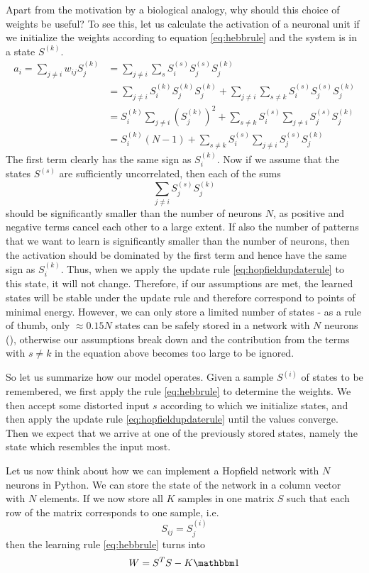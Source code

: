 \documentclass[a4paper, draft]{article}
\theoremstyle{own}
\theoremstyle{remark}
\begin{document}
Apart from the motivation by a biological analogy, why should this choice of weights be useful? To see this, let us calculate the activation of a neuronal unit if we initialize the weights according to equation \eqref{eq:hebbrule} and the system is in a state $S^{(k)}$.
\begin{align*}
a_i = \sum_{j \neq i} w_{ij} S_j^{(k)} &= 
\sum_{j \neq i} \sum_s S_i^{(s)} S_j^{(s)} S_j^{(k)} \\
&= \sum_{j \neq i} S_i^{(k)} S_j^{(k)} S_j^{(k)} + \sum_{j \neq i} \sum_{s \neq k} S_i^{(s)} S_j^{(s)} S_j^{(k)} \\
&= S_i^{(k)} \sum_{j \neq i}  (S_j^{(k)})^2 + \sum_{s \neq k} S_i^{(s)} 
\sum_{j \neq i} S_j^{(s)} S_j^{(k)} \\
&= S_i^{(k)} (N-1) + \sum_{s \neq k} S_i^{(s)} 
\sum_{j \neq i} S_j^{(s)} S_j^{(k)}
\end{align*}
The first term clearly has the same sign as $S_i^{(k)}$. Now if we assume that the states $S^{(s)}$ are sufficiently uncorrelated, then each of the sums
$$
\sum_{j \neq i} S_j^{(s)} S_j^{(k)}
$$
should be significantly smaller than the number of neurons $N$, as positive and negative terms cancel each other to a large extent. If also the number of patterns that we want to learn is significantly smaller than the number of neurons, then the activation should be dominated by the first term and hence have the same sign as $S_i^{(k)}$. Thus, when we apply the update rule 
\eqref{eq:hopfieldupdaterule} to this state, it will not change. Therefore, if our assumptions are met, the learned states will be stable under the update rule and therefore correspond to points of minimal energy. However, we can only store a limited number of states - as a rule of thumb, only $\approx 0.15 N$ states can be safely stored in a network with $N$ neurons (\cite{Hopfield1982}), otherwise our assumptions break down and the contribution from the terms with $s \neq k$ in the equation above becomes too large to be ignored.

So let us summarize how our model operates. Given a sample $S^{(i)}$ of states to be remembered, we first apply the rule \eqref{eq:hebbrule} to determine the weights. We then accept some distorted input $s$ according to which we initialize states, and then apply the update rule \eqref{eq:hopfieldupdaterule} until the values converge. Then we expect that we arrive at one of the previously stored states, namely the state which resembles the input most.

Let us now think about how we can implement a Hopfield network with $N$ neurons in Python. We can store the state of the network in a column vector with $N$ elements. If we now store all $K$ samples in one matrix $S$ such that each row of the matrix corresponds to one sample, i.e.
$$
S_{ij} = S^{(i)}_j
$$ 
then the learning rule \eqref{eq:hebbrule} turns into
$$
W = S^T S  - K{\mathbbm 1}
$$
\end{document}
